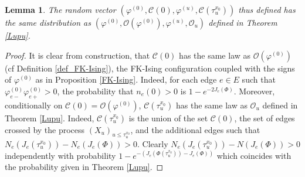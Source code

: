\documentclass[11pt,a4paper]{amsart}
\numberwithin{equation}{section}
\newtheorem{lemma}[proposition]{Lemma}
\def\ccc{{\mathcal C}}
\def\ooo{{\mathcal{O}}}
\begin{document}
\begin{lemma}
\label{end-distrib}
The random vector $(\varphi^{(0)}, \ccc(0), \varphi^{(u)}, \ccc(\tau_u^{x_0}))$ thus defined has the same distribution
 as $(\varphi^{(0)}, \ooo(\varphi^{(0)}), \varphi^{(u)}, \ooo_u)$ defined in Theorem \ref{Lupu}.
\end{lemma}
\begin{proof}
It is clear from construction, that $\ccc(0)$ has the same law as $\ooo(\varphi^{(0)})$ (cf Definition \ref{def_FK-Ising}), the FK-Ising configuration coupled with the signs of
$\varphi^{(0)}$ as in Proposition \ref{FK-Ising}. Indeed, for each edge $e\in E$ such that $\varphi^{(0)}_{e-}\varphi^{(0)}_{e+}>0$, the probability that
$n_e(0)>0$ is $1-e^{-2J_e(\Phi)}$.
Moreover, conditionally on $\ccc(0)=\ooo(\varphi^{(0)})$, $\ccc(\tau_u^{x_0})$ has the same law as $\ooo_u$ defined in Theorem \ref{Lupu}. Indeed, $\ccc(\tau_u^{x_0})$
is the union of the set $\ccc(0)$, the set of edges crossed by the process $(X_u)_{u\le \tau_u^{x_0}}$, and the additional edges such that $N_e(J_e(\tau_u^{x_0}))-N_e(J_e(\Phi))>0$.
Clearly $N_e(J_e(\tau_u^{x_0}))-N(J_e(\Phi))>0$ independently with probability $1-e^{-(J_e(\Phi(\tau_u^{x_0}))-J_e(\Phi))}$ which coincides with the probability given in
Theorem \ref{Lupu}. 
\end{proof}
\end{document}
